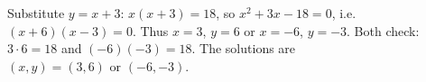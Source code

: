 Substitute $y=x+3$: $x(x+3)=18$, so $x^2+3x-18=0$, i.e. $(x+6)(x-3)=0$. Thus $x=3$, $y=6$ or $x=-6$, $y=-3$. Both check: $3\cdot6=18$ and $(-6)(-3)=18$. The solutions are $\boxed{(x,y)=(3,6)\text{ or }(-6,-3)}$.
